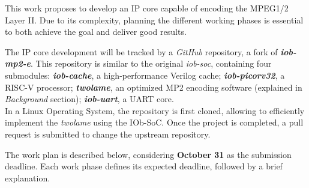 
This work proposes to develop an IP core capable of encoding the MPEG1/2 Layer II. Due to its complexity, planning the different working phases is essential to both achieve the goal and deliver good results. 

The IP core development will be tracked by a \textit{GitHub} repository, a fork of \textbf{\textit{iob-mp2-e}}. This repository is similar to the original \textit{iob-soc}, containing four submodules: \textbf{\textit{iob-cache}}, a high-performance Verilog cache; \textbf{\textit{iob-picorv32}}, a RISC-V processor; \textbf{\textit{twolame}}, an optimized MP2 encoding software (explained in \textit{Background} section); \textbf{\textit{iob-uart}}, a UART core.\\
In a Linux Operating System, the repository is first cloned, allowing to efficiently implement the \textit{twolame} using the IOb-SoC. Once the project is completed, a pull request is submitted to change the upstream repository.

The work plan is described below, considering \textbf{October 31} as the submission deadline.
Each work phase defines its expected deadline, followed by a brief explanation.


